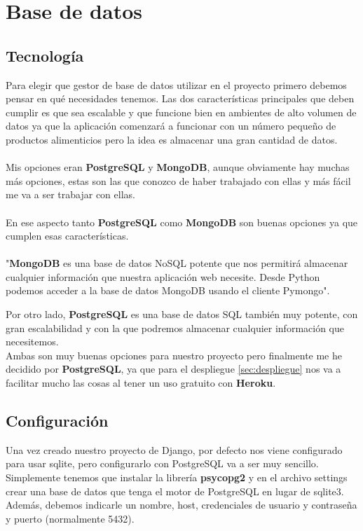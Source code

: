 \section{Base de datos} \label{sec:base_datos}

\subsection{Tecnología}

Para elegir que gestor de base de datos utilizar en el proyecto primero debemos pensar en qué necesidades tenemos.
Las dos características principales que deben cumplir es que sea escalable y que funcione bien en ambientes de alto volumen 
de datos ya que la aplicación comenzará a funcionar con un número pequeño de productos alimenticios pero la idea es almacenar una gran cantidad de datos.\\ \\
Mis opciones eran \textbf{PostgreSQL} y \textbf{MongoDB}, aunque obviamente hay muchas más opciones, estas son las que conozco de haber trabajado con ellas y
más fácil me va a ser trabajar con ellas.\\ \\

En ese aspecto tanto \textbf{PostgreSQL} como \textbf{MongoDB} son buenas opciones ya que cumplen esas características.\\ \\

"\textbf{MongoDB} \cite{NoSQL} es una base de datos NoSQL potente que nos permitirá almacenar cualquier información que nuestra aplicación web necesite. Desde Python podemos acceder a la base de datos MongoDB usando el cliente Pymongo".

Por otro lado, \textbf{PostgreSQL} es una base de datos SQL también muy potente, con gran escalabilidad y con la que podremos almacenar cualquier información que necesitemos.\\

Ambas son muy buenas opciones para nuestro proyecto pero finalmente me he decidido por \textbf{PostgreSQL}, ya que para el despliegue \ref*{sec:despliegue} nos va a facilitar mucho las cosas
al tener un uso gratuito con \textbf{Heroku}.

\subsection{Configuración}

Una vez creado nuestro proyecto de Django, por defecto nos viene configurado para usar sqlite, pero configurarlo con PostgreSQL va a ser muy sencillo.
Simplemente tenemos que instalar la librería \textbf{psycopg2} y en el archivo settings crear una base de datos que tenga el motor de PostgreSQL en lugar de sqlite3.
Además, debemos indicarle un nombre, host, credenciales de usuario y contraseña y puerto (normalmente 5432).\\ \\

